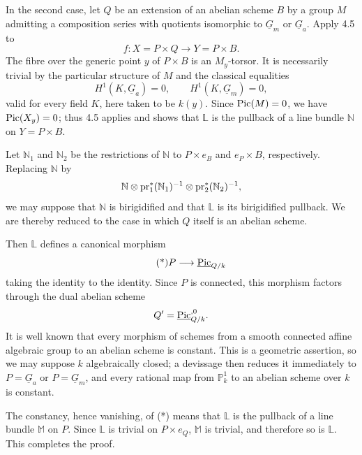 In the second case, let $Q$ be an extension of an abelian scheme $B$
by a group $M$ admitting a composition series with quotients
isomorphic to $\underline G_m$ or $\underline G_a$.  Apply 4.5 to
\[
 f:X=P\times Q\longrightarrow Y=P\times B.
\]
The fibre over the generic point $y$ of $P\times B$ is an
$M_y$-torsor.  It is necessarily trivial by the particular structure
of $M$ and the classical equalities
\[
 H^1(K,\underline G_a)=0,
 \qquad
 H^1(K,\underline G_m)=0,
\]
valid for every field $K$, here taken to be $k(y)$.  Since
$\operatorname{Pic}(M)=0$, we have $\operatorname{Pic}(X_y)=0$; thus 4.5 applies and shows that
$\mathbb L$ is the pullback of a line bundle $\mathbb N$ on
$Y=P\times B$.

Let $\mathbb N_1$ and $\mathbb N_2$ be the restrictions of $\mathbb
N$ to $P\times e_B$ and $e_P\times B$, respectively.  Replacing
$\mathbb N$ by
\[
 \mathbb N\otimes\operatorname{pr}_1^*(\mathbb N_1)^{-1}
 \otimes\operatorname{pr}_2^*(\mathbb N_2)^{-1},
\]
we may suppose that $\mathbb N$ is birigidified and that $\mathbb L$
is its birigidified pullback.  We are thereby reduced to the case in
which $Q$ itself is an abelian scheme.

Then $\mathbb L$ defines a canonical morphism
\begin{equation}\tag{*}
 P\longrightarrow\underline{\Pic}_{Q/k}
\end{equation}
taking the identity to the identity.  Since $P$ is connected, this
morphism factors through the dual abelian scheme
\[
 Q'=\underline{\Pic}^{,0}_{Q/k}.
\]
It is well known that every morphism of schemes from a smooth
connected affine algebraic group to an abelian scheme is constant.
This is a geometric assertion, so we may suppose $k$ algebraically
closed; a devissage then reduces it immediately to $P=\underline
G_a$ or $P=\underline G_m$, and every rational map from
$\mathbb P^1_k$ to an abelian scheme over $k$ is constant.

The constancy, hence vanishing, of (*) means that $\mathbb L$ is the
pullback of a line bundle $\mathbb M$ on $P$.  Since $\mathbb L$ is
trivial on $P\times e_Q$, $\mathbb M$ is trivial, and therefore so is
$\mathbb L$.  This completes the proof.

